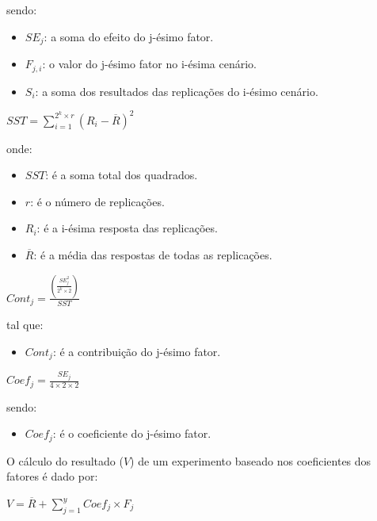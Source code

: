 \documentclass[pt,disc,oneside]{ufscpgeasthesis}
\begin{document}
			sendo:

			\begin{itemize}
				\item{$SE_j$:} a soma do efeito do j-ésimo fator.
				\item{$F_{j,i}$:} o valor do j-ésimo fator no i-ésima cenário.
				\item{$S_i$:} a soma dos resultados das replicações do i-ésimo cenário.
			\end{itemize}

			\begin{center}
				\LARGE{$SST = \sum_{i=1}^{2^k \times r} (R_i-\overline{R})^2$}
			\end{center}

			onde:

			\begin{itemize}
				\item{$SST$:} é a soma total dos quadrados.
				\item{$r$:} é o número de replicações.
				\item{$R_i$:} é a i-ésima resposta das replicações.
				\item{$\overline{R}$:} é a média das respostas de todas as replicações.
			\end{itemize}

			\begin{center}
				\LARGE{$Cont_j = \frac{(\frac{SE_j^2}{2^k \times 2})}{SST}$}
			\end{center}

			tal que:

			\begin{itemize}
				\item{$Cont_j$:} é a contribuição do j-ésimo fator.
			\end{itemize}

			\begin{center}
				\LARGE{$Coef_j = \frac{SE_j}{4 \times 2 \times 2} $}
			\end{center}

			sendo:

			\begin{itemize}
				\item{$Coef_j$:} é o coeficiente do j-ésimo fator.
			\end{itemize}

			O cálculo do resultado ($V$) de um experimento baseado nos coeficientes dos fatores é dado por:

			\begin{center}
				\LARGE{$V = \overline{R} + \sum_{j=1}^{y} Coef_j \times F_j$}
			\end{center}
\end{document}

